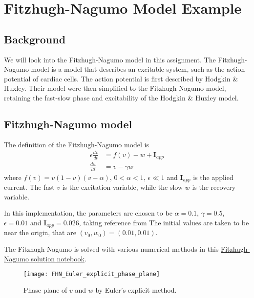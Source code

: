 \chapter{Fitzhugh-Nagumo Model Example}
\label{chap:fitzhugh-nagumo}
\section{Background}
\label{sec:background}
We will look into the Fitzhugh-Nagumo model in this assignment. The Fitzhugh-Nagumo model is a model that describes an excitable system, such as the action potential of cardiac cells. The action potential is first described by Hodgkin \& Huxley. Their model were then simplified to the Fitzhugh-Nagumo model, retaining the fast-slow phase and excitability of the Hodgkin \& Huxley model. %

\section{Fitzhugh-Nagumo model}
\label{sec:FHN}
The definition of the Fitzhugh-Nagumo model is
\begin{align}
    \epsilon \frac{dv}{dt} &= f(v) - w + \mathbf{I}_{app} \\
    \frac{dw}{dt} &= v - \gamma w
\end{align}
where $f(v) = v(1-v)(v-\alpha)$, $0 < \alpha < 1$, $\epsilon \ll 1$ and $\mathbf{I}_{app}$ is the applied current. The fast $v$ is the excitation variable, while the slow $w$ is the recovery variable.

In this implementation, the parameters are chosen to be $\alpha = 0.1$, $\gamma = 0.5$, $\epsilon = 0.01$ and $\mathbf{I}_{app} = 0.026$, taking reference from %
The initial values are taken to be near the origin, that are $(v_0, w_0) = (0.01, 0.01)$. 

The Fitzhugh-Nagumo is solved with various numerical methods in this \href{https://nbviewer.jupyter.org/github/FarmHJ/numerical-solver/blob/main/examples/fitzhugh_nagumo.ipynb}{Fitzhugh-Nagumo solution notebook}. 

\begin{figure}
    \texttt{[image: FHN\_Euler\_explicit\_phase\_plane]}
    \caption{Phase plane of $v$ and $w$ by Euler's explicit method.}
    \label{fig:Euler_explicit_phase_plane}
\end{figure}

